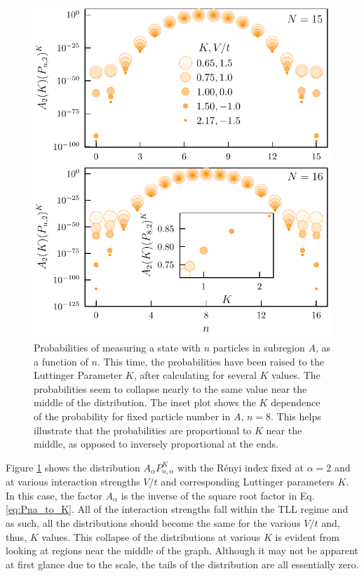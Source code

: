 \begin{figure}[htp]
\begin{center}
\includegraphics[width=1.0\columnwidth]{TLLCollapse.pdf}
\end{center}
\caption{Probabilities of measuring a state with $n$ particles in subregion $A$, as  a function of $n$. This time, the probabilities have been raised to the Luttinger Parameter $K$, after calculating for several $K$ values. The probabilities seem to collapse nearly to the same value near the middle of the distribution. The inset plot shows the $K$ dependence of the probability for fixed particle number in $A$, $n=8$. This helps illustrate that the probabilities are proportional to $K$ near the middle, as opposed to inversely proportional at the ends.}
\label{fig:K_collapse}
\end{figure}
 
Figure \ref{fig:K_collapse} shows the distribution $A_{\alpha} P_{n,\alpha}^{K}$ with the R\'enyi index fixed at $\alpha=2$ and at various interaction strengths $V/t$ and corresponding Luttinger parameters $K$. In this case, the factor $A_{\alpha}$ is the inverse of the square root factor in Eq. \ref{eq:Pna_to_K}. All of the interaction strengths fall within the TLL regime and as such, all the distributions should become the same for the various $V/t$ and, thus, $K$ values. This collapse of the distributions at various $K$ is evident from looking at regions near the middle of the graph. Although it may not be apparent at first glance due to the scale, the tails of the distribution are all essentially zero.

